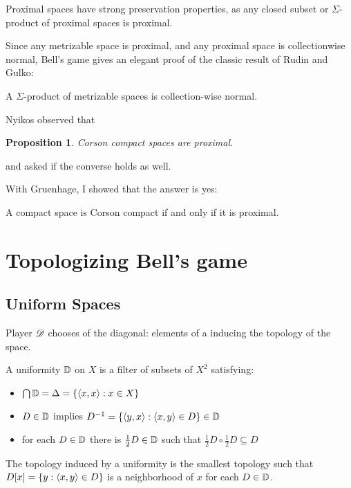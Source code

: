 \documentclass{beamer}
\newtheorem{proposition}[theorem]{Proposition}
\theoremstyle{definition}
\begin{document}
\begin{frame}
  Proximal spaces have strong preservation properties, as any
  closed subset or $\Sigma$-product of proximal spaces is proximal.

  \vpause

  Since any metrizable space is proximal, and
  any proximal space is collectionwise normal, Bell's game gives an elegant
  proof of the classic result of Rudin and Gulko:

  \begin{theorem}
    A $\Sigma$-product of metrizable spaces is collection-wise normal.
  \end{theorem}
\end{frame}

\begin{frame}
  Nyikos \cite{MR3288115} observed that
  \begin{proposition}
    Corson compact spaces are proximal.
  \end{proposition}
  and asked if the converse holds as well.

  \vpause

  With Gruenhage, I showed that the answer is yes: \cite{MR3227201}
  \begin{theorem}
    A compact space is Corson compact if and only if it is proximal.
  \end{theorem}
\end{frame}


\section{Topologizing Bell's game}

\subsection{Uniform Spaces}

\begin{frame}
  Player $\mathscr{D}$ chooses  of the diagonal: elements of
  a  inducing the topology of the space.

  \vpause

  A uniformity $\mathbb{D}$ on $X$ is a filter of subsets of $X^2$
  satisfying:
  \begin{itemize}
    \item $\bigcap \mathbb{D} = \Delta=\{\langle x,x\rangle:x\in X\}$
    \item $D\in\mathbb{D}$ implies $D^{-1}=\{\langle y,x\rangle:\langle x,y\rangle\in D\}\in\mathbb{D}$
    \item for each $D\in\mathbb{D}$ there is $\frac{1}{2}D\in\mathbb{D}$ such that
          $\frac{1}{2}D\circ\frac{1}{2}D\subseteq D$
  \end{itemize}

  \vpause

  The topology induced by a uniformity is the smallest topology such that
  $D[x]=\{y:\langle x,y\rangle\in D\}$ is a neighborhood of $x$ for each $D\in\mathbb{D}$.
\end{frame}
\end{document}
